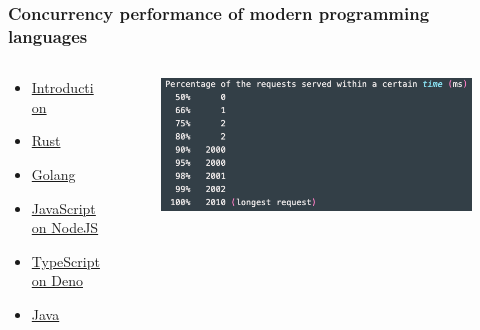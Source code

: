 \begin{frame}[fragile]
    \frametitle{Concurrency performance of modern programming languages}
% 
    \begin{columns}
        \begin{column}{.4\textwidth}
            \begin{itemize}
                \item \href{https://deepu.tech/concurrency-in-modern-languages/}{Introduction}
                \item \href{https://deepu.tech/concurrency-in-modern-languages-rust/}{Rust}
                \item \href{https://deepu.tech/concurrency-in-modern-languages-go/}{Golang}
                \item \href{https://deepu.tech/concurrency-in-modern-languages-js/}{JavaScript on NodeJS}
                \item \href{https://deepu.tech/concurrency-in-modern-languages-ts/}{TypeScript on Deno}
                \item \href{https://deepu.tech/concurrency-in-modern-languages-java/}{Java}
            \end{itemize}
        \end{column}
        
        \begin{column}{.6\textwidth}
        \begin{figure}
        \includegraphics[width=0.9\linewidth]{figs/rust-performance.png}
        \end{figure}
        \end{column}
    \end{columns}

\end{frame}

